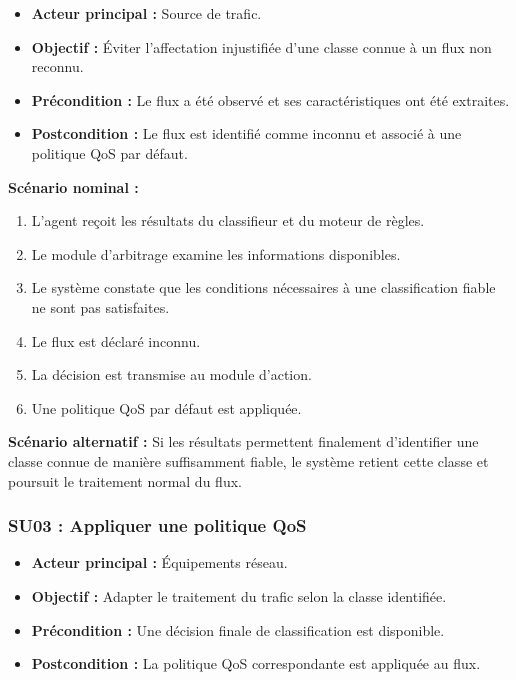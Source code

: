 \begin{itemize}
    \item \textbf{Acteur principal :} Source de trafic.
    \item \textbf{Objectif :} Éviter l'affectation injustifiée
    d'une classe connue à un flux non reconnu.
    \item \textbf{Précondition :} Le flux a été observé et
    ses caractéristiques ont été extraites.
    \item \textbf{Postcondition :} Le flux est identifié
    comme inconnu et associé à une politique QoS par défaut.
\end{itemize}

\textbf{Scénario nominal :}
\begin{enumerate}
    \item L'agent reçoit les résultats du classifieur
    et du moteur de règles.
    \item Le module d'arbitrage examine les informations
    disponibles.
    \item Le système constate que les conditions nécessaires
    à une classification fiable ne sont pas satisfaites.
    \item Le flux est déclaré inconnu.
    \item La décision est transmise au module d'action.
    \item Une politique QoS par défaut est appliquée.
\end{enumerate}

\textbf{Scénario alternatif :}
Si les résultats permettent finalement d'identifier
une classe connue de manière suffisamment fiable,
le système retient cette classe et poursuit le traitement
normal du flux.


\subsubsection{SU03 : Appliquer une politique QoS}

\begin{itemize}
    \item \textbf{Acteur principal :} Équipements réseau.
    \item \textbf{Objectif :} Adapter le traitement du trafic
    selon la classe identifiée.
    \item \textbf{Précondition :} Une décision finale
    de classification est disponible.
    \item \textbf{Postcondition :} La politique QoS
    correspondante est appliquée au flux.
\end{itemize}

